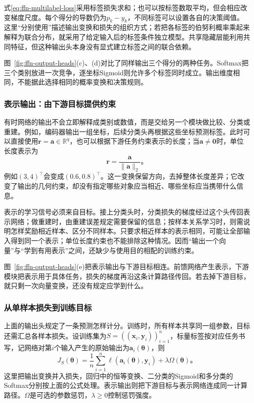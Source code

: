 式\eqref{eq:ffn-multilabel-loss}采用标签损失求和；也可以按标签数取平均，但会相应改变梯度尺度。每个得分的导数仍为$p_k-y_k$，不同标签可以设置各自的决策阈值。这里“分别使用”描述输出变换和损失的组织方式；若把各标签的伯努利概率乘起来解释为联合分布，就采用了给定输入后的标签条件独立模型。共享隐藏层能利用共同特征，但这种输出头本身没有显式建立标签之间的联合依赖。

图~\ref{fig:ffn-output-heads}(c)、(d)对比了同样输出三个得分的两种任务。Softmax把三个类别放进一次竞争，逐坐标Sigmoid则允许多个标签同时成立。输出维度相同，不能据此选择相同的概率变换和决策规则。


\subsubsection{表示输出：由下游目标提供约束}
\label{sec:ffn-output-representation}

有时网络的输出不会立即解释成类别或数值，而是交给另一个模块做比较、分类或重建。例如，编码器输出一组坐标，后续分类头再根据这些坐标预测标签。此时可以直接使用$\bm{r}=\bm{a}\in\mathbb{R}^{q}$，也可以根据下游任务约束表示的长度；当$\bm{a}\neq\bm{0}$时，单位长度表示为
\begin{equation}
  \bm{r}=\frac{\bm{a}}{\lVert\bm{a}\rVert_2}\text{。}
  \label{eq:ffn-normalized-representation}
\end{equation}
例如$(3,4)^{\top}$会变成$(0.6,0.8)^{\top}$。这一变换保留方向，去掉整体长度差异；它改变了输出的几何约束，却没有指定哪些对象应当相近、哪些坐标应当携带什么信息。

表示的学习信号必须来自目标。接上分类头时，分类损失的梯度经过这个头传回表示网络；做重建时，由重建误差规定需要保留的信息；按样本关系学习时，则需说明怎样奖励相近样本、区分不同样本。只要求相近样本的表示相同，可能让全部输入得到同一个表示；单位长度约束也不能排除这种情况。因而“输出一个向量”与“学到有用表示”之间，还缺少与使用目的相配的训练约束。

图~\ref{fig:ffn-output-heads}(e)把表示输出与下游目标相连。前馈网络产生表示，下游模块把表示用于具体任务，损失的梯度再沿这条计算路径传回。若去掉下游目标，就只剩一次向量变换，还没有规定应学到什么。


\subsubsection{从单样本损失到训练目标}
\label{sec:ffn-empirical-objective}

上面的输出头规定了一条预测怎样计分。训练时，所有样本共享同一组参数，目标还需汇总各样本损失。设训练集为$S=((\bm{x}_i,\bm{y}_i))_{i=1}^{n}$，标量标签按对应任务书写，记网络对第$i$个输入产生的原始输出为$\bm{a}_i(\bm{\theta})$，则
\begin{equation}
  J_S(\bm{\theta})=
  \frac1n\sum_{i=1}^{n}\ell\!\left(\bm{a}_i(\bm{\theta}),\bm{y}_i\right)
  +\lambda\Omega(\bm{\theta})\text{。}
  \label{eq:ffn-training-objective}
\end{equation}
这里把输出变换并入损失，回归中的恒等变换、二分类的Sigmoid和多分类的Softmax分别按上面的公式处理。表示输出则把下游目标与表示网络连成同一计算路径。$\Omega$是可选的参数惩罚，$\lambda\geq0$控制惩罚强度。

